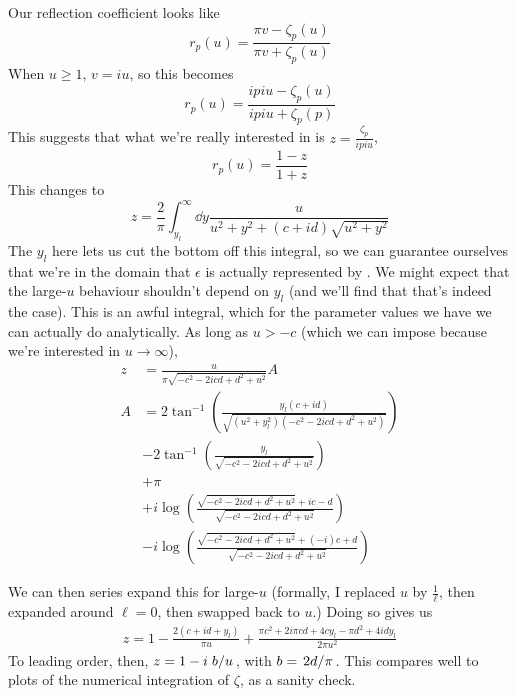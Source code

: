 \documentclass[11pt]{article}
\begin{document}
	Our reflection coefficient looks like
	\begin{equation}
		r_p(u) = \frac{\pi v - \zeta_p(u)}{\pi v + \zeta_p(u)}
	\end{equation}
	When $u \geq 1$, $v = i u$, so this becomes
	\begin{equation}
		r_p(u) = \frac{i pi u - \zeta_p(u)}{i pi u + \zeta_p(p)}
	\end{equation}
	This suggests that what we're really interested in is $z = \frac{\zeta_p}{i pi u}$,
	\begin{equation}
		r_p(u) = \frac{1 - z}{1 + z} \label{eq:rpdef}
	\end{equation}
	This changes  to
	\begin{equation}
		z = \frac{2}{\pi} \int_{y_l}^\infty \dd{y} \frac{u}{u^2 + y^2 + (c + id)\sqrt{u^2 + y^2}}
	\end{equation}
	The $y_l$ here lets us cut the bottom off this integral, so we can guarantee ourselves that we're in the domain that $\epsilon$ is actually represented by .
	We might expect that the large-$u$ behaviour shouldn't depend on $y_l$ (and we'll find that that's indeed the case).
	This is an awful integral, which for the parameter values we have we can actually do analytically.
	As long as $u > -c$ (which we can impose because we're interested in $u \rightarrow \infty$),
	\begin{align}
		z &= \frac{u}{{\pi  \sqrt{-c^2-2 i c d+d^2+u^2}}} A\\
		A &= 2 \tan ^{-1}\left(\frac{y_l (c+i d)}{\sqrt{\left(u^2+y_l^2\right) \left(-c^2-2 i c d+d^2+u^2\right)}}\right)\\
		&-2 \tan ^{-1}\left(\frac{y_l}{\sqrt{-c^2-2 i c d+d^2+u^2}}\right) \\
		&+ \pi \\
		&+i \log \left(\frac{\sqrt{-c^2-2 i c d+d^2+u^2}+i c-d}{\sqrt{-c^2-2 i c d+d^2+u^2}}\right) \\
		&-i \log \left(\frac{\sqrt{-c^2-2 i c d+d^2+u^2}+(-i) c+d}{\sqrt{-c^2-2 i c d+d^2+u^2}}\right)
	\end{align}

	We can then series expand this for large-$u$ (formally, I replaced $u$ by $\frac{1}{\ell}$, then expanded around $\ell = 0$, then swapped back to $u$.)
	Doing so gives us
	\begin{align}
		z = 1 -\frac{2 (c+i d+y_l)}{\pi  u} + \frac{\pi  c^2+2 i \pi  c d+4 c y_l-\pi  d^2+4 i d y_l}{2 \pi  u^2}
	\end{align}
	To leading order, then, $z = 1 - i \flatfrac{b}{u}$, with $b = \flatfrac{2 d}{\pi}$.
	This compares well to plots of the numerical integration of $\zeta$, as a sanity check. 
\end{document}
